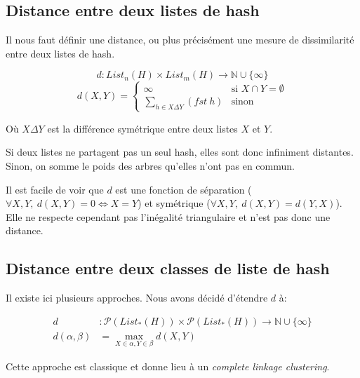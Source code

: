\subsection{Distance entre deux listes de hash}
Il nous faut définir une distance, ou plus précisément une mesure de dissimilarité entre deux listes de hash.

$$
d : List_n(H) \times List_m(H) \to \mathbb{N} \cup \{\infty\}
$$
\[
d (X,Y) =
\begin{cases}
	\infty & \text{si $X \cap Y = \emptyset$} \\
	\sum\limits_{h \in X \Delta Y} (fst\ h) & \text{sinon}
\end{cases}
\]

Où $X \Delta Y$ est la différence symétrique entre deux listes $X$ et $Y$.

Si deux listes ne partagent pas un seul hash, elles sont donc infiniment distantes. Sinon, on somme le poids des arbres qu'elles n'ont pas en commun.

Il est facile de voir que $d$ est une fonction de séparation ($\forall X,Y,\ d(X,Y) = 0 \iff X = Y$) et symétrique ($\forall X,Y,\ d(X,Y) = d(Y,X)$). Elle ne respecte cependant pas l'inégalité triangulaire et n'est pas donc une distance.


\subsection{Distance entre deux classes de liste de hash}
Il existe ici plusieurs approches.
Nous avons décidé d'étendre $d$ à:

\begin{align*}
d &: \mathcal{P}(List_*(H)) \times \mathcal{P}(List_*(H)) \to \mathbb{N} \cup \{\infty\}\\
d(\alpha,\beta) &= \max\limits_{X \in \alpha, Y \in \beta} d(X,Y)
\end{align*}

Cette approche est classique et donne lieu à un \emph{complete linkage clustering}.